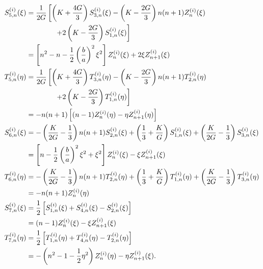 \begin{align}\label{Eq1:stress}
\begin{split}
	S_{5,n}^{(i)}(\xi) &= \frac{1}{2G}\left[\left(K+\frac{4G}{3}\right)S_{3,n}^{(i)}(\xi) - \left(K-\frac{2G}{3}\right) n(n+1)Z_n^{(i)}(\xi)\right.\\ 
	&{\hskip4em\relax}\left. + 2\left(K-\frac{2G}{3}\right) S_{1,n}^{(i)}(\xi)\right] \\
	&= \left[n^2-n-\frac{1}{2}\left(\frac{b}{a}\right)^2\xi^2\right] Z_n^{(i)}(\xi) + 2\xi Z_{n+1}^{(i)}(\xi)\\
	T_{5,n}^{(i)}(\eta) &= \frac{1}{2G}\left[\left(K+\frac{4G}{3}\right)T_{3,n}^{(i)}(\eta) - \left(K-\frac{2G}{3}\right) n(n+1)T_{2,n}^{(i)}(\eta)\right.\\ 
	&{\hskip4em\relax}\left. + 2\left(K-\frac{2G}{3}\right) T_{1,n}^{(i)}(\eta)\right] \\
	&= -n(n+1)\left[(n-1)Z_n^{(i)}(\eta) - \eta Z_{n+1}^{(i)}(\eta)\right]\\
	S_{6,n}^{(i)}(\xi) &= -\left(\frac{K}{2G}-\frac13\right)n(n+1)S_{2,n}^{(i)}(\xi) +\left(\frac13+\frac{K}{G} \right)S_{1,n}^{(i)}(\xi) + \left(\frac{K}{2G}-\frac13\right)S_{3,n}^{(i)}(\xi)\\
	&= \left[n-\frac{1}{2}\left(\frac{b}{a}\right)^2\xi^2+\xi^2\right] Z_n^{(i)}(\xi) - \xi Z_{n+1}^{(i)}(\xi)\\
	T_{6,n}^{(i)}(\eta) &=  -\left(\frac{K}{2G}-\frac13\right)n(n+1)T_{2,n}^{(i)}(\eta) +\left(\frac13+\frac{K}{G} \right)T_{1,n}^{(i)}(\eta) + \left(\frac{K}{2G}-\frac13\right)T_{3,n}^{(i)}(\eta)\\
	&= -n(n+1)Z_n^{(i)}(\eta)\\
	S_{7,n}^{(i)}(\xi) &= \frac{1}{2}\left[S_{1,n}^{(i)}(\xi) + S_{4,n}^{(i)}(\xi) - S_{2,n}^{(i)}(\xi) \right] \\
	&= (n-1)Z_n^{(i)}(\xi) -\xi Z_{n+1}^{(i)}(\xi)\\
	T_{7,n}^{(i)}(\eta) &= \frac{1}{2}\left[T_{1,n}^{(i)}(\eta) + T_{4,n}^{(i)}(\eta) - T_{2,n}^{(i)}(\eta) \right] \\
	&= -\left(n^2-1-\frac{1}{2}\eta^2\right)Z_n^{(i)}(\eta) - \eta Z_{n+1}^{(i)}(\xi).
	\end{split}
\end{align}
%
